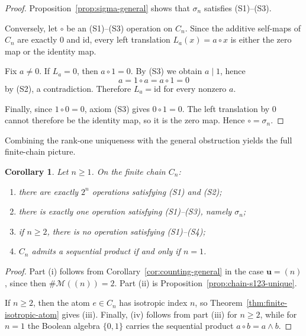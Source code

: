 \documentclass[11pt]{article}
\newtheorem{corollary}[theorem]{Corollary}
\theoremstyle{definition}
\theoremstyle{remark}
\numberwithin{equation}{section}
\newcommand{\id}{\mathrm{id}}
\newcommand{\Cn}{C_n}
\begin{document}
\begin{proof}
Proposition~\ref{prop:sigma-general} shows that $\sigma_n$ satisfies \textup{(S1)}--\textup{(S3)}.

Conversely, let $\circ$ be an \textup{(S1)}--\textup{(S3)} operation on $\Cn$. Since the additive self-maps of $\Cn$ are exactly $0$ and $\id$, every left translation $L_a(x)=a\circ x$ is either the zero map or the identity map.

Fix $a\neq 0$. If $L_a=0$, then $a\circ 1=0$. By \textup{(S3)} we obtain $a\mid 1$, hence
\[
a=1\circ a=a\circ 1=0
\]
by \textup{(S2)}, a contradiction. Therefore $L_a=\id$ for every nonzero $a$.

Finally, since $1\circ 0=0$, axiom \textup{(S3)} gives $0\circ 1=0$. The left translation by $0$ cannot therefore be the identity map, so it is the zero map. Hence $\circ=\sigma_n$.
\end{proof}

Combining the rank-one uniqueness with the general obstruction yields the full finite-chain picture.

\begin{corollary}\label{cor:chain-collapse}
Let $n\ge 1$. On the finite chain $\Cn$:
\begin{enumerate}[label=\textup{(\roman*)},leftmargin=2.7em]
    \item there are exactly $2^n$ operations satisfying \textup{(S1)} and \textup{(S2)};
    \item there is exactly one operation satisfying \textup{(S1)}--\textup{(S3)}, namely $\sigma_n$;
    \item if $n\ge 2$, there is no operation satisfying \textup{(S1)}--\textup{(S4)};
    \item $\Cn$ admits a sequential product if and only if $n=1$.
\end{enumerate}
\end{corollary}

\begin{proof}
Part \textup{(i)} follows from Corollary~\ref{cor:counting-general} in the case $\mathbf u=(n)$, since then $\#\mathcal M((n))=2$. Part \textup{(ii)} is Proposition~\ref{prop:chain-s123-unique}.

If $n\ge 2$, then the atom $e\in \Cn$ has isotropic index $n$, so Theorem~\ref{thm:finite-isotropic-atom} gives \textup{(iii)}. Finally, \textup{(iv)} follows from part \textup{(iii)} for $n\ge 2$, while for $n=1$ the Boolean algebra $\{0,1\}$ carries the sequential product $a\circ b=a\wedge b$.
\end{proof}
\end{document}
